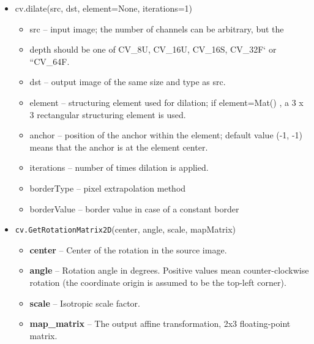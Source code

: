 \documentclass[11pt]{ctexart}
\begin{document}
\begin{itemize}
    \item cv.dilate(src, dst, element=None, iterations=1)
     \begin{itemize}
    \item src – input image; the number of channels can be arbitrary, but the \item depth should be one of CV\_8U, CV\_16U, CV\_16S, CV\_32F` or ``CV\_64F.
    \item dst – output image of the same size and type as src.
    \item element – structuring element used for dilation; if element=Mat() , a 3 x 3 rectangular structuring element is used.
    \item anchor – position of the anchor within the element; default value (-1, -1) means that the anchor is at the element center.
    \item iterations – number of times dilation is applied.
    \item borderType – pixel extrapolation method
    \item borderValue – border value in case of a constant border
    \end{itemize}
\end{itemize}



    \begin{itemize}
        \item
          \texttt{cv.GetRotationMatrix2D}(center, angle, scale, mapMatrix)
          \begin{itemize}
          \item
            \textbf{center} -- Center of the rotation in the source image.
          \item
            \textbf{angle} -- Rotation angle in degrees. Positive values mean
            counter-clockwise rotation (the coordinate origin is assumed to be
            the top-left corner).
          \item
            \textbf{scale} -- Isotropic scale factor.
          \item
            \textbf{map\_matrix} -- The output affine transformation, 2x3
            floating-point matrix.
          \end{itemize}
    \end{itemize}
\end{document}
